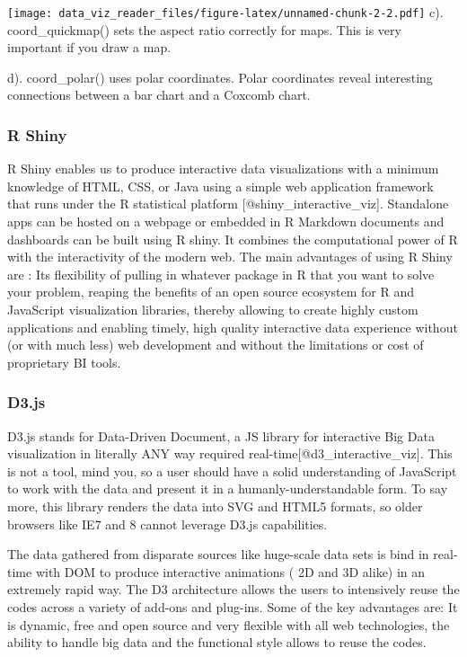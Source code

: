\documentclass[]{book}
\theoremstyle{definition}
\theoremstyle{definition}
\theoremstyle{definition}
\theoremstyle{remark}
\begin{document}
\texttt{[image: data\_viz\_reader\_files/figure-latex/unnamed-chunk-2-2.pdf]}
c). coord\_quickmap() sets the aspect ratio correctly for maps. This is
very important if you draw a map.

d). coord\_polar() uses polar coordinates. Polar coordinates reveal
interesting connections between a bar chart and a Coxcomb chart.

\subsubsection{R Shiny}\label{r-shiny}

R Shiny enables us to produce interactive data visualizations with a
minimum knowledge of HTML, CSS, or Java using a simple web application
framework that runs under the R statistical platform
{[}@shiny\_interactive\_viz{]}. Standalone apps can be hosted on a
webpage or embedded in R Markdown documents and dashboards can be built
using R shiny. It combines the computational power of R with the
interactivity of the modern web. The main advantages of using R Shiny
are : Its flexibility of pulling in whatever package in R that you want
to solve your problem, reaping the benefits of an open source ecosystem
for R and JavaScript visualization libraries, thereby allowing to create
highly custom applications and enabling timely, high quality interactive
data experience without (or with much less) web development and without
the limitations or cost of proprietary BI tools.

\subsubsection{D3.js}\label{d3.js}

D3.js stands for Data-Driven Document, a JS library for interactive Big
Data visualization in literally ANY way required
real-time{[}@d3\_interactive\_viz{]}. This is not a tool, mind you, so a
user should have a solid understanding of JavaScript to work with the
data and present it in a humanly-understandable form. To say more, this
library renders the data into SVG and HTML5 formats, so older browsers
like IE7 and 8 cannot leverage D3.js capabilities.

The data gathered from disparate sources like huge-scale data sets is
bind in real-time with DOM to produce interactive animations ( 2D and 3D
alike) in an extremely rapid way. The D3 architecture allows the users
to intensively reuse the codes across a variety of add-ons and plug-ins.
Some of the key advantages are: It is dynamic, free and open source and
very flexible with all web technologies, the ability to handle big data
and the functional style allows to reuse the codes.
\end{document}
